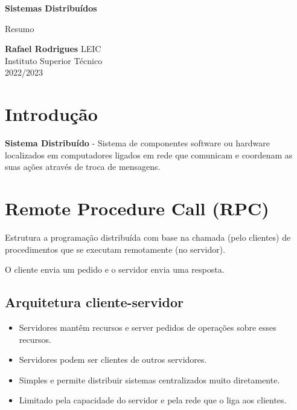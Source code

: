 \documentclass[12pt]{article}
\begin{document}
\begin{titlepage}
    \begin{center}
        \vspace*{1cm}

        \textbf{\LARGE Sistemas Distribuídos}
        \vspace{0.5cm}

        \Large Resumo
        \vspace{1.5cm}

        \textbf{Rafael Rodrigues}
        \vfill
        LEIC \\
        Instituto Superior Técnico \\
        2022/2023
    \end{center}
\end{titlepage}

\tableofcontents

\newpage

\section{Introdução}

\textbf{Sistema Distribuído} - Sistema de componentes software ou hardware localizados em computadores ligados em rede que comunicam e coordenam as suas ações através de troca de mensagens.

\newpage

\section{Remote Procedure Call (RPC) }

Estrutura a programação distribuída com base na chamada (pelo clientes) de procedimentos que se executam remotamente (no servidor).

O cliente envia um pedido e o servidor envia uma resposta.

\subsection{Arquitetura cliente-servidor}

\begin{itemize}
    \item Servidores mantêm recursos e server pedidos de operações sobre esses recursos.
    \item Servidores podem ser clientes de outros servidores.
    \item Simples e permite distribuir sistemas centralizados muito diretamente.
    \item Limitado pela capacidade do servidor e pela rede que o liga aos clientes.
\end{itemize}
\end{document}
